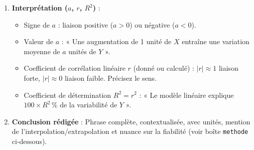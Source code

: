 \documentclass[11pt]{article}
\begin{document}
\begin{methode}
\begin{enumerate}
    \item \textbf{Interprétation ($a$, $r$, $R^2$)} : 
    \begin{itemize}
        \item Signe de $a$ : liaison positive ($a>0$) ou négative ($a<0$).
        \item Valeur de $a$ : « Une augmentation de 1 unité de $X$ entraîne une variation moyenne de $a$ unités de $Y$ ».
        \item Coefficient de corrélation linéaire $r$ (donné ou calculé) : $|r| \approx 1$ liaison forte, $|r| \approx 0$ liaison faible. Précisez le sens.
        \item Coefficient de détermination $R^2 = r^2$ : « Le modèle linéaire explique $100 \times R^2\,\%$ de la variabilité de $Y$ ».
    \end{itemize}
    \item \textbf{Conclusion rédigée} : Phrase complète, contextualisée, avec unités, mention de l'interpolation/extrapolation et nuance sur la fiabilité (voir boîte \texttt{methode} ci-dessous).
\end{enumerate}
\end{methode}
\end{document}
